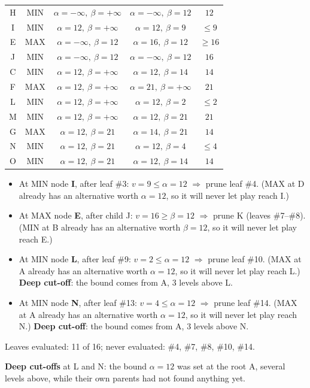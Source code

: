 \documentclass[11pt,a4paper]{article}
\begin{document}
\begin{solbox}
\begin{center}
\begin{tabular}{c c c c c}
H & MIN & $\alpha=-\infty,\ \beta=+\infty$ & $\alpha=-\infty,\ \beta=12$ & $12$ \\
I & MIN & $\alpha=12,\ \beta=+\infty$ & $\alpha=12,\ \beta=9$ & $\le 9$ \\
E & MAX & $\alpha=-\infty,\ \beta=12$ & $\alpha=16,\ \beta=12$ & $\ge 16$ \\
J & MIN & $\alpha=-\infty,\ \beta=12$ & $\alpha=-\infty,\ \beta=12$ & $16$ \\
C & MIN & $\alpha=12,\ \beta=+\infty$ & $\alpha=12,\ \beta=14$ & $14$ \\
F & MAX & $\alpha=12,\ \beta=+\infty$ & $\alpha=21,\ \beta=+\infty$ & $21$ \\
L & MIN & $\alpha=12,\ \beta=+\infty$ & $\alpha=12,\ \beta=2$ & $\le 2$ \\
M & MIN & $\alpha=12,\ \beta=+\infty$ & $\alpha=12,\ \beta=21$ & $21$ \\
G & MAX & $\alpha=12,\ \beta=21$ & $\alpha=14,\ \beta=21$ & $14$ \\
N & MIN & $\alpha=12,\ \beta=21$ & $\alpha=12,\ \beta=4$ & $\le 4$ \\
O & MIN & $\alpha=12,\ \beta=21$ & $\alpha=12,\ \beta=14$ & $14$ \\\bottomrule\end{tabular}\end{center}\begin{itemize}[leftmargin=1.5em,itemsep=1pt]
\item At MIN node \textbf{I}, after leaf \#3: $v=9 \le \alpha=12$ $\Rightarrow$ prune leaf \#4. (MAX at D already has an alternative worth $\alpha=12$, so it will never let play reach I.)
\item At MAX node \textbf{E}, after child J: $v=16 \ge \beta=12$ $\Rightarrow$ prune K (leaves \#7--\#8). (MIN at B already has an alternative worth $\beta=12$, so it will never let play reach E.)
\item At MIN node \textbf{L}, after leaf \#9: $v=2 \le \alpha=12$ $\Rightarrow$ prune leaf \#10. (MAX at A already has an alternative worth $\alpha=12$, so it will never let play reach L.) \textbf{Deep cut-off}: the bound comes from A, 3 levels above L.
\item At MIN node \textbf{N}, after leaf \#13: $v=4 \le \alpha=12$ $\Rightarrow$ prune leaf \#14. (MAX at A already has an alternative worth $\alpha=12$, so it will never let play reach N.) \textbf{Deep cut-off}: the bound comes from A, 3 levels above N.
\end{itemize}Leaves evaluated: 11 of 16; never evaluated: \#4, \#7, \#8, \#10, \#14.\par\textbf{Deep cut-offs} at L and N: the bound $\alpha=12$ was set at the root A, several levels above, while their own parents had not found anything yet.
\end{solbox}
\end{document}
